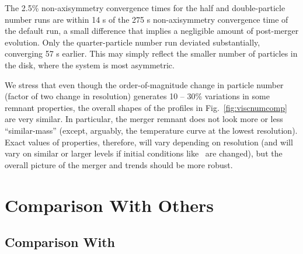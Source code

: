 
The 2.5\% non-axisymmetry convergence times for the half and double-particle number runs are within 14 s of the 275 s non-axisymmetry convergence time of the default run, a small difference that implies a negligible amount of post-merger evolution.  Only the quarter-particle number run deviated substantially, converging 57 s earlier.  This may simply reflect the smaller number of particles in the disk, where the system is most asymmetric.

We stress that even though the order-of-magnitude change in particle number (factor of two change in resolution) generates 10 -- 30\% variations in some remnant properties, the overall shapes of the profiles in Fig.~\ref{fig:viscnumcomp} are very similar.  In particular, the merger remnant does not look more or less ``similar-mass'' (except, arguably, the temperature curve at the lowest resolution).  Exact values of properties, therefore, will vary depending on resolution (and will vary on similar or larger levels if initial conditions like \azero\ are changed), but the overall picture of the merger and trends should be more robust.



\section{Comparison With Others}
\label{sec:compwithothers}


\subsection{Comparison With \cite{loreig09}}
\label{ssec:compwithloreig}


